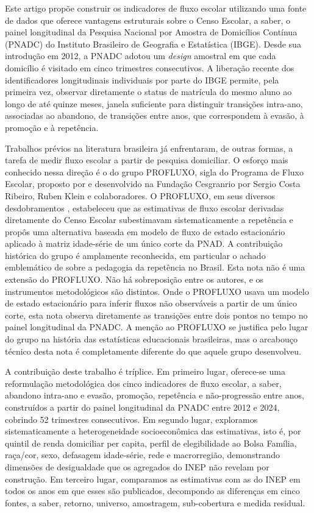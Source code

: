 Este artigo propõe construir os indicadores de fluxo escolar utilizando
uma fonte de dados que oferece vantagens estruturais sobre o Censo
Escolar, a saber, o painel longitudinal da Pesquisa Nacional por
Amostra de Domicílios Contínua (PNADC) do Instituto Brasileiro de
Geografia e Estatística (IBGE). Desde sua introdução em 2012, a PNADC
adotou um \emph{design} amostral em que cada domicílio é visitado em
cinco trimestres consecutivos. A liberação recente dos identificadores
longitudinais individuais por parte do IBGE permite, pela primeira vez,
observar diretamente o status de matrícula do mesmo aluno ao longo de
até quinze meses, janela suficiente para distinguir transições
intra-ano, associadas ao abandono, de transições entre anos, que
correspondem à evasão, à promoção e à repetência.

Trabalhos prévios na literatura brasileira já enfrentaram, de outras
formas, a tarefa de medir fluxo escolar a partir de pesquisa
domiciliar. O esforço mais conhecido nessa direção é o do grupo
PROFLUXO, sigla do Programa de Fluxo Escolar, proposto por
\cite{Fletcher1985_modelo} e desenvolvido na Fundação Cesgranrio por
Sergio Costa Ribeiro, Ruben Klein e colaboradores. O PROFLUXO, em
seus diversos desdobramentos \citep{Fletcher1985_repetencia,
Fletcher1985_modelo, FletcherRibeiro1989_profluxo,
Ribeiro1991_pedagogia, KleinRibeiro1991_censo, Klein2006_educacao},
estabeleceu que as estimativas de fluxo escolar derivadas diretamente
do Censo Escolar subestimavam sistematicamente a repetência e propôs
uma alternativa baseada em modelo de fluxo de estado estacionário
aplicado à matriz idade-série de um único corte da PNAD. A
contribuição histórica do grupo é amplamente reconhecida, em
particular o achado emblemático de \cite{Ribeiro1991_pedagogia} sobre
a pedagogia da repetência no Brasil. Esta nota não é uma extensão do
PROFLUXO. Não há sobreposição entre os autores, e os instrumentos
metodológicos são distintos. Onde o PROFLUXO usava um modelo de
estado estacionário para inferir fluxos não observáveis a partir de
um único corte, esta nota observa diretamente as transições entre
dois pontos no tempo no painel longitudinal da PNADC. A menção ao
PROFLUXO se justifica pelo lugar do grupo na história das
estatísticas educacionais brasileiras, mas o arcabouço técnico desta
nota é completamente diferente do que aquele grupo desenvolveu.

A contribuição deste trabalho é tríplice. Em primeiro lugar, oferece-se
uma reformulação metodológica dos cinco indicadores de fluxo escolar,
a saber, abandono intra-ano e evasão, promoção, repetência e
não-progressão entre anos, construídos a partir do painel longitudinal
da PNADC entre 2012 e 2024, cobrindo 52 trimestres consecutivos. Em
segundo lugar, exploramos sistematicamente a heterogeneidade
socioeconômica das estimativas, isto é, por quintil de renda
domiciliar per capita, perfil de elegibilidade ao Bolsa Família,
raça/cor, sexo, defasagem idade-série, rede e macrorregião, demonstrando
dimensões de desigualdade que os agregados do INEP não revelam por
construção. Em terceiro lugar, comparamos as estimativas com as do
INEP em todos os anos em que esses são publicados, decompondo as
diferenças em cinco fontes, a saber, retorno, universo, amostragem,
sub-cobertura e medida residual.

